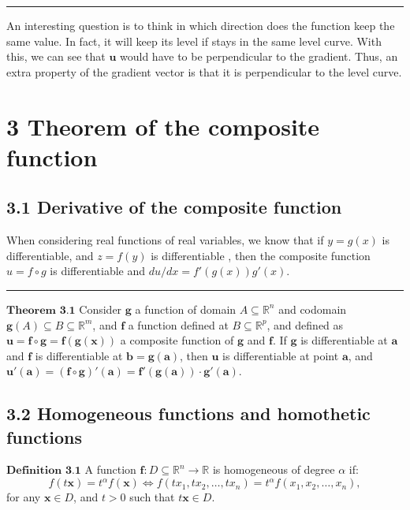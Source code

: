\documentclass[0pt, a4paper]{article}
\begin{document}
\noindent\rule{\textwidth}{1pt}

An interesting question is to think in which direction does the function keep the same value. In fact, it will keep its level if stays in the same level curve. With this, we can see that $\textbf{u}$ would have to be perpendicular to the gradient. Thus, an extra property of the gradient vector is that it is perpendicular to the level curve.

\clearpage

\section*{3 Theorem of the composite function}
\subsection*{3.1 Derivative of the composite function}

When considering real functions of real variables, we know that if $y=g(x)$ is differentiable, and $z=f(y)$ is differentiable , then the composite function $u=f\circ g$ is differentiable and $du/dx=f'(g(x))g'(x)$.

\noindent\rule{\textwidth}{1pt}

$\textbf{Theorem 3.1}$ Consider $\textbf{g}$ a function of domain $A\subseteq\mathbb{R}^n$ and codomain $\textbf{g}(A)\subseteq B\subseteq\mathbb{R}^m$, and $\textbf{f}$ a function defined at $B\subseteq\mathbb{R}^p$, and defined as $\textbf{u}=\textbf{f}\circ\textbf{g}=\textbf{f}(\textbf{g}(\textbf{x}))$ a composite function of $\textbf{g}$ and $\textbf{f}$. If $\textbf{g}$ is differentiable at $\textbf{a}$ and $\textbf{f}$ is differentiable at $\textbf{b}=\textbf{g}(\textbf{a})$, then $\textbf{u}$ is differentiable at point $\textbf{a}$, and $\textbf{u}'(\textbf{a})=(\textbf{f}\circ \textbf{g})'(\textbf{a})=\textbf{f}'(\textbf{g}(\textbf{a}))\cdot\textbf{g}'(\textbf{a})$.

\subsection*{3.2 Homogeneous functions and homothetic functions}

$\textbf{Definition 3.1}$ A function $\textbf{f}:D\subseteq\mathbb{R}^n\to\mathbb{R}$ is homogeneous of degree $\alpha$ if:
$$f(t\textbf{x})=t^\alpha f(\textbf{x})\Leftrightarrow f(tx_1,tx_2,\dots,tx_n)=t^\alpha f(x_1,x_2,\dots,x_n),$$ 
for any $\textbf{x}\in D$, and $t>0$ such that $t\textbf{x}\in D$.
\end{document}
